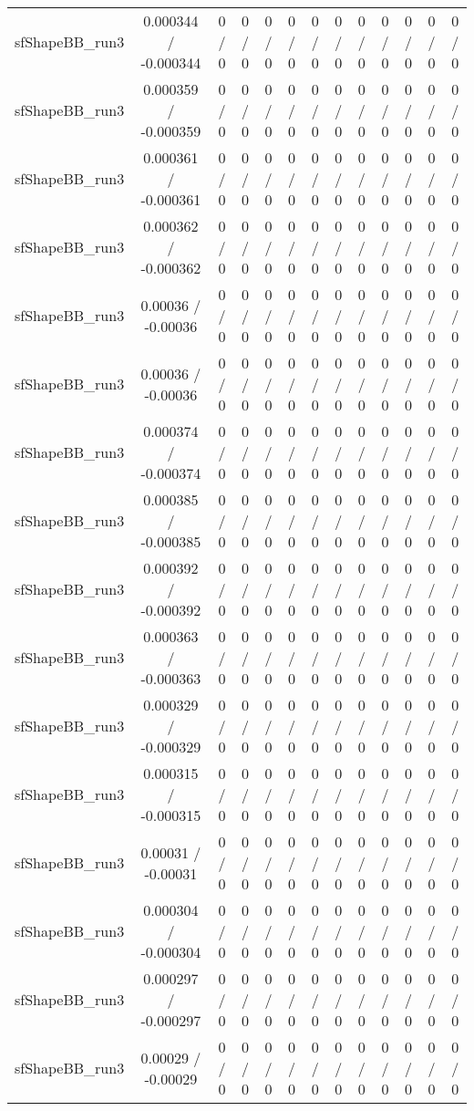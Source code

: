\documentclass[10pt]{article}
\begin{document}
\begin{table}[htbp]
\begin{center}
\begin{tabular}{|c|c|c|c|c|c|c|c|c|c|c|c|c|}
  sfShapeBB_run3 & 0.000344 / -0.000344 & 0 / 0 & 0 / 0 & 0 / 0 & 0 / 0 & 0 / 0 & 0 / 0 & 0 / 0 & 0 / 0 & 0 / 0 & 0 / 0 & 0 / 0 \\ 
  sfShapeBB_run3 & 0.000359 / -0.000359 & 0 / 0 & 0 / 0 & 0 / 0 & 0 / 0 & 0 / 0 & 0 / 0 & 0 / 0 & 0 / 0 & 0 / 0 & 0 / 0 & 0 / 0 \\ 
  sfShapeBB_run3 & 0.000361 / -0.000361 & 0 / 0 & 0 / 0 & 0 / 0 & 0 / 0 & 0 / 0 & 0 / 0 & 0 / 0 & 0 / 0 & 0 / 0 & 0 / 0 & 0 / 0 \\ 
  sfShapeBB_run3 & 0.000362 / -0.000362 & 0 / 0 & 0 / 0 & 0 / 0 & 0 / 0 & 0 / 0 & 0 / 0 & 0 / 0 & 0 / 0 & 0 / 0 & 0 / 0 & 0 / 0 \\ 
  sfShapeBB_run3 & 0.00036 / -0.00036 & 0 / 0 & 0 / 0 & 0 / 0 & 0 / 0 & 0 / 0 & 0 / 0 & 0 / 0 & 0 / 0 & 0 / 0 & 0 / 0 & 0 / 0 \\ 
  sfShapeBB_run3 & 0.00036 / -0.00036 & 0 / 0 & 0 / 0 & 0 / 0 & 0 / 0 & 0 / 0 & 0 / 0 & 0 / 0 & 0 / 0 & 0 / 0 & 0 / 0 & 0 / 0 \\ 
  sfShapeBB_run3 & 0.000374 / -0.000374 & 0 / 0 & 0 / 0 & 0 / 0 & 0 / 0 & 0 / 0 & 0 / 0 & 0 / 0 & 0 / 0 & 0 / 0 & 0 / 0 & 0 / 0 \\ 
  sfShapeBB_run3 & 0.000385 / -0.000385 & 0 / 0 & 0 / 0 & 0 / 0 & 0 / 0 & 0 / 0 & 0 / 0 & 0 / 0 & 0 / 0 & 0 / 0 & 0 / 0 & 0 / 0 \\ 
  sfShapeBB_run3 & 0.000392 / -0.000392 & 0 / 0 & 0 / 0 & 0 / 0 & 0 / 0 & 0 / 0 & 0 / 0 & 0 / 0 & 0 / 0 & 0 / 0 & 0 / 0 & 0 / 0 \\ 
  sfShapeBB_run3 & 0.000363 / -0.000363 & 0 / 0 & 0 / 0 & 0 / 0 & 0 / 0 & 0 / 0 & 0 / 0 & 0 / 0 & 0 / 0 & 0 / 0 & 0 / 0 & 0 / 0 \\ 
  sfShapeBB_run3 & 0.000329 / -0.000329 & 0 / 0 & 0 / 0 & 0 / 0 & 0 / 0 & 0 / 0 & 0 / 0 & 0 / 0 & 0 / 0 & 0 / 0 & 0 / 0 & 0 / 0 \\ 
  sfShapeBB_run3 & 0.000315 / -0.000315 & 0 / 0 & 0 / 0 & 0 / 0 & 0 / 0 & 0 / 0 & 0 / 0 & 0 / 0 & 0 / 0 & 0 / 0 & 0 / 0 & 0 / 0 \\ 
  sfShapeBB_run3 & 0.00031 / -0.00031 & 0 / 0 & 0 / 0 & 0 / 0 & 0 / 0 & 0 / 0 & 0 / 0 & 0 / 0 & 0 / 0 & 0 / 0 & 0 / 0 & 0 / 0 \\ 
  sfShapeBB_run3 & 0.000304 / -0.000304 & 0 / 0 & 0 / 0 & 0 / 0 & 0 / 0 & 0 / 0 & 0 / 0 & 0 / 0 & 0 / 0 & 0 / 0 & 0 / 0 & 0 / 0 \\ 
  sfShapeBB_run3 & 0.000297 / -0.000297 & 0 / 0 & 0 / 0 & 0 / 0 & 0 / 0 & 0 / 0 & 0 / 0 & 0 / 0 & 0 / 0 & 0 / 0 & 0 / 0 & 0 / 0 \\ 
  sfShapeBB_run3 & 0.00029 / -0.00029 & 0 / 0 & 0 / 0 & 0 / 0 & 0 / 0 & 0 / 0 & 0 / 0 & 0 / 0 & 0 / 0 & 0 / 0 & 0 / 0 & 0 / 0 \\ 

\end{tabular}
\end{center}
\end{table}
\end{document}
